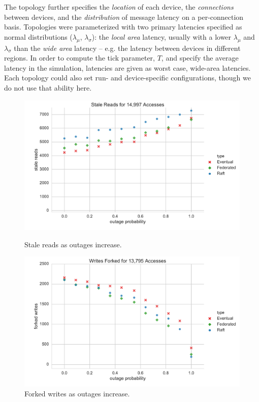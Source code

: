 \documentclass[10pt,conference,letterpaper]{IEEEtran}
\begin{document}
The topology further specifies the \textit{location} of each device, the
\textit{connections} between devices, and the \textit{distribution} of message latency on
a per-connection basis.
Topologies were parameterized with two primary latencies specified as normal distributions ($\lambda_{\mu}$,
$\lambda_{\sigma}$): the \textit{local area} latency, usually with a lower $\lambda_{\mu}$
and $\lambda_{\sigma}$ than the \textit{wide area} latency -- e.g.
the latency between devices in different regions.
In order to compute the tick parameter, $T$, and specify the average latency in the
simulation, latencies are given as worst case, wide-area latencies.
Each topology could also set run- and device-specific configurations, though we
do not use that ability here.

\begin{figure}[t]
    \centering
      \includegraphics[width=\linewidth]{figures/outages/stale_reads}
      \caption{Stale reads as outages increase.}\label{fig:outages_stale_reads}
    \endminipage
      \includegraphics[width=\linewidth]{figures/outages/forked_writes}
      \caption{Forked writes as outages increase.}\label{fig:outages_forked_writes}
    \endminipage\hfill
\end{figure}
\end{document}
